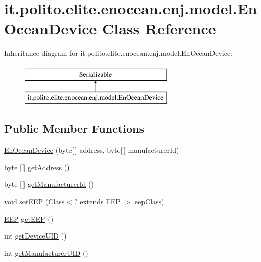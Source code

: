 \hypertarget{classit_1_1polito_1_1elite_1_1enocean_1_1enj_1_1model_1_1_en_ocean_device}{}\section{it.\+polito.\+elite.\+enocean.\+enj.\+model.\+En\+Ocean\+Device Class Reference}
\label{classit_1_1polito_1_1elite_1_1enocean_1_1enj_1_1model_1_1_en_ocean_device}
Inheritance diagram for it.\+polito.\+elite.\+enocean.\+enj.\+model.\+En\+Ocean\+Device\+:\begin{figure}[H]
\begin{center}
\leavevmode
\includegraphics[height=2.000000cm]{classit_1_1polito_1_1elite_1_1enocean_1_1enj_1_1model_1_1_en_ocean_device}
\end{center}
\end{figure}
\subsection*{Public Member Functions}
\begin{DoxyCompactItemize}
\item 
\hyperlink{classit_1_1polito_1_1elite_1_1enocean_1_1enj_1_1model_1_1_en_ocean_device_a28575e219842a0cae0dc387b38716bce}{En\+Ocean\+Device} (byte\mbox{[}$\,$\mbox{]} address, byte\mbox{[}$\,$\mbox{]} manufacturer\+Id)
\item 
byte \mbox{[}$\,$\mbox{]} \hyperlink{classit_1_1polito_1_1elite_1_1enocean_1_1enj_1_1model_1_1_en_ocean_device_a5580d2482513303b9d4f6d3b0822e324}{get\+Address} ()
\item 
byte \mbox{[}$\,$\mbox{]} \hyperlink{classit_1_1polito_1_1elite_1_1enocean_1_1enj_1_1model_1_1_en_ocean_device_a1f7a10d71f6e0316b76d4bc8313720ae}{get\+Manufacturer\+Id} ()
\item 
void \hyperlink{classit_1_1polito_1_1elite_1_1enocean_1_1enj_1_1model_1_1_en_ocean_device_a80ebd2e361f82b0d7ade169d2690dcdf}{set\+E\+EP} (Class$<$? extends \hyperlink{classit_1_1polito_1_1elite_1_1enocean_1_1enj_1_1eep_1_1_e_e_p}{E\+EP} $>$ eep\+Class)
\item 
\hyperlink{classit_1_1polito_1_1elite_1_1enocean_1_1enj_1_1eep_1_1_e_e_p}{E\+EP} \hyperlink{classit_1_1polito_1_1elite_1_1enocean_1_1enj_1_1model_1_1_en_ocean_device_a645305a968639d3b9e7dfee10b3fa30e}{get\+E\+EP} ()
\item 
int \hyperlink{classit_1_1polito_1_1elite_1_1enocean_1_1enj_1_1model_1_1_en_ocean_device_acad2c5bf937c5b7af7047fb924fb34b5}{get\+Device\+U\+ID} ()
\item 
int \hyperlink{classit_1_1polito_1_1elite_1_1enocean_1_1enj_1_1model_1_1_en_ocean_device_a4146d6a1aa6bcac98f038151e4581708}{get\+Manufacturer\+U\+ID} ()
\end{DoxyCompactItemize}
